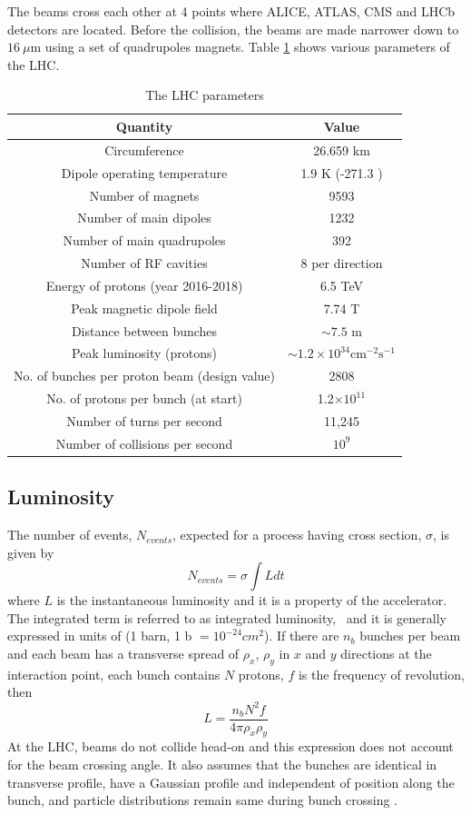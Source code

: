 The beams cross each other at 4 points where ALICE, ATLAS, CMS and LHCb detectors are located. Before the collision, the beams are made 
narrower down to $16\ \mu$m using a set of quadrupoles magnets. Table \ref{tab:LHCparms} shows various parameters of the LHC.
\begin{table}[h!]
\centering
\caption[The LHC parameters]{The LHC parameters \cite{LHCfaq}}
\label{tab:LHCparms}
\begin{tabular}{|c|c|}
\hline  
Quantity			&	Value  \\ \hline
Circumference  &	26.659 km  \\ 
Dipole operating temperature	&	1.9 K (-271.3 \textcelsius) \\
Number of magnets	&	9593 \\
Number of main dipoles	&	1232 \\
Number of main quadrupoles	&	392 \\
Number of RF cavities	&	8 per direction \\
Energy of protons (year 2016-2018)	&	6.5 TeV\\
Peak magnetic dipole field &	7.74 T\\
Distance between bunches	&	$\sim 7.5$ m\\
Peak luminosity (protons)	&	$\sim 1.2\times 10^{34} \mathrm{cm}^{-2}\mathrm{s}^{-1}$\\
No. of bunches per proton beam (design value)	&	2808\\
No. of protons per bunch (at start)	&	1.2$\times10^{11}$\\
Number of turns per second &	11,245 \\
Number of collisions per second	&	$10^9$\\\hline 
\end{tabular} 
\end{table}
\subsection{Luminosity}
The number of events, $N_{events}$, expected for a process having cross section, $\sigma$, is given by
\begin{equation}
N_{events} = \sigma\int Ldt
\end{equation}
where $L$ is the instantaneous luminosity and it is a property of the accelerator. The integrated term is referred to as integrated 
luminosity, \lumi\ and it is generally expressed in units of \fbinv (1 barn, 1 b $= 10^{-24}cm^{2}$).
If there are $n_b$ bunches per beam and each beam has a transverse spread of $\rho_{x}$, $\rho_y$ in $x$ and $y$ directions at the 
interaction point, each bunch contains $N$ protons, $f$ is the frequency of revolution, then
\begin{equation}
L = \frac{n_b N^2f}{4\pi\rho_x \rho_y}
\end{equation}
At the LHC, beams do not collide head-on and this expression does not account for the beam crossing angle.
It also assumes that the bunches are identical in transverse profile, 
have a Gaussian profile and independent of position along the bunch, and particle distributions remain same during bunch crossing \cite{Patrignani:2016xqp}.

